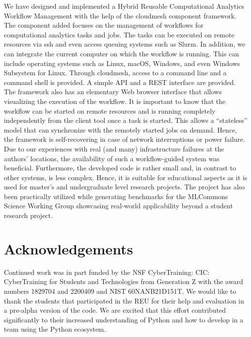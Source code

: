\documentclass[sigplan,screen]{acmart}
\newcommand{\FILE}[1]{}
\begin{document}
We have designed and implemented a Hybrid Reusable Computational
Analytics Workflow Management with the help of the cloudmesh component
framework. The component added focuses on the management of workflows
for computational analytics tasks and jobs. The tasks can be executed
on remote resources via ssh and even access queuing systems such as
Slurm. In addition, we can integrate the current computer on which the
workflow is running. This can include operating systems such as Linux,
macOS, Windows, and even Windows Subsystem for Linux. Through
cloudmesh, access to a command line and a command shell is provided. A
simple API and a REST interface are provided. The framework also has
an elementary Web browser interface that allows visualizing the
execution of the workflow. It is important to know that the workflow
can be started on remote resources and is running completely
independently from the client tool once a task is started. This allows
a ``stateless'' model that can synchronize with the remotely started
jobs on demand. Hence, the framework is self-recovering in case of
network interruptions or power failure. Due to our experiences with
real (and many) infrastructure failures at the authors' locations, the
availability of such a workflow-guided system was
beneficial. Furthermore, the developed code is rather small and, in
contrast to other systems, is less complex. Hence, it is suitable for
educational aspects as it is used for master's and undergraduate level
research projects. The project has also been practically utilized
while generating benchmarks for the MLCommons Science Working Group
showcasing real-world applicability beyond a student research project.


% 

\FILE{acknowledgements.tex}


\section*{Acknowledgements}

Continued work was in part funded by the NSF CyberTraining: CIC:
CyberTraining for Students and Technologies from Generation Z with the
award numbers 1829704 and 2200409 and NIST 60NANB21D151T. We would like to
thank the students that participated in the REU for their help and
evaluation in a pre-alpha version of the code. We are excited that
this effort contributed significantly to their increased understanding
of Python and how to develop in a team using the Python ecosystem.
\end{document}
